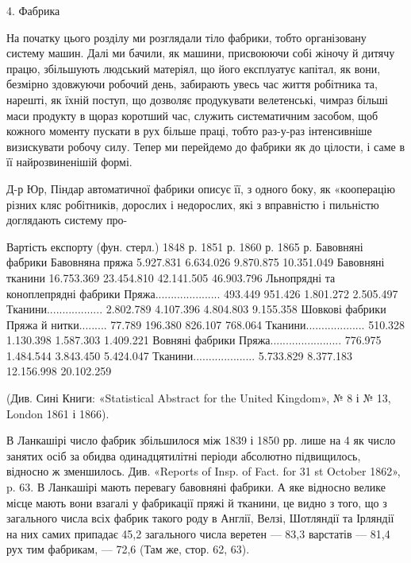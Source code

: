 4. Фабрика

На початку цього розділу ми розглядали тіло фабрики, тобто
організовану систему машин. Далі ми бачили, як машини, присвоюючи
собі жіночу й дитячу працю, збільшують людський
матеріял, що його експлуатує капітал, як вони, безмірно здовжуючи
робочий день, забирають увесь час життя робітника та,
нарешті, як їхній поступ, що дозволяє продукувати велетенські,
чимраз більші маси продукту в щораз коротший час, служить
систематичним засобом, щоб кожного моменту пускати в рух
більше праці, тобто раз-у-раз інтенсивніше визискувати робочу
силу. Тепер ми перейдемо до фабрики як до цілости, і саме в її
найрозвиненішій формі.

Д-р Юр, Піндар автоматичної фабрики описує її, з одного
боку, як «кооперацію різних кляс робітників, дорослих і недорослих,
які з вправністю і пильністю доглядають систему про-

                                                                            Вартість експорту (фун.
стерл.)
                                                       1848 р.                    1851 р.           
   1860 р.               1865 р.
Бавовняні фабрики
Бавовняна пряжа                  5.927.831                6.634.026             9.870.875        
10.351.049
Бавовняні тканини                 16.753.369           23.454.810        42.141.505         
46.903.796
Льнопрядні та коноплепрядні фабрики
Пряжа.....................                  493.449                 951.426             1.801.272   
       2.505.497
Тканини..................                 2.802.789             4.107.396             4.804.803     
    9.155.358
Шовкові фабрики
Пряжа й нитки.........                   77.789                 196.380              826.107        
     768.064
Тканини...................                 510.328               1.130.398          1.587.303       
    1.409.221
Вовняні фабрики
Пряжа.......................               776.975              1.484.544            3.843.450      
   5.424.047
Тканини....................               5.733.829             8.377.183           12.156.998      
 20.102.259

(Див. Сині Книги: «Statistical Abstract for the United Kingdom»,
№ 8 і № 13, London 1861 і 1866).

В Ланкашірі число фабрик збільшилося між 1839 і 1850 рр. лише на
4%
як число занятих осіб за обидва одинадцятилітні періоди абсолютно підвищилось,
відносно ж зменшилось. Див. «Reports of Insp. of Fact. for
31 st October 1862», p. 63. В Ланкашірі мають перевагу бавовняні фабрики.
А яке відносно велике місце мають вони взагалі у фабрикації пряжі й
тканини, це видно з того, що з загального числа всіх фабрик такого роду
в Англії, Велзі, Шотляндії та Ірляндії на них самих припадає 45,2%
загального числа веретен — 83,3%
варстатів — 81,4%
рух тим фабрикам, — 72,6%
(Там же, стор. 62, 63).
